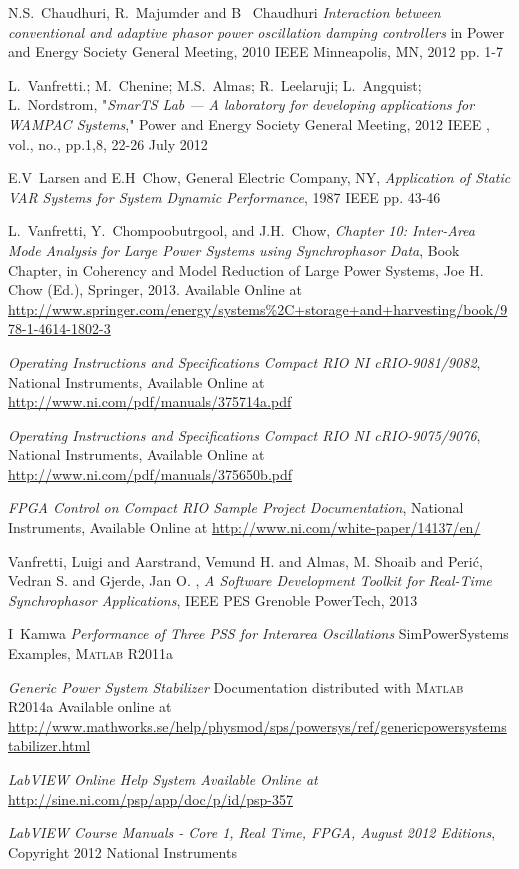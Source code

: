 \documentclass[journal]{IEEEtran}
\begin{document}
\begin{thebibliography}{1}
 N.S.~Chaudhuri, R.~Majumder and B~ Chaudhuri \emph{Interaction between conventional and adaptive phasor power oscillation damping controllers} in Power and Energy Society General Meeting, 2010 IEEE Minneapolis, MN, 2012 pp. 1-7

 L.~Vanfretti.; M.~Chenine; M.S.~Almas; R.~Leelaruji; L.~Angquist; L.~Nordstrom, "\emph{SmarTS Lab — A laboratory for developing applications for WAMPAC Systems}," Power and Energy Society General Meeting, 2012 IEEE , vol., no., pp.1,8, 22-26 July 2012

 E.V~Larsen and E.H~Chow, General Electric Company, NY, \emph{Application of Static VAR Systems for System Dynamic Performance}, 1987 IEEE pp. 43-46

  L.~Vanfretti, Y.~Chompoobutrgool, and J.H.~Chow, \emph{Chapter 10: Inter-Area Mode Analysis for Large Power Systems using Synchrophasor Data}, Book Chapter, in Coherency and Model Reduction of Large Power Systems, Joe H. Chow (Ed.), Springer, 2013. Available Online at \url{http://www.springer.com/energy/systems%2C+storage+and+harvesting/book/978-1-4614-1802-3}

 \emph{Operating Instructions and Specifications Compact RIO NI cRIO-9081/9082}, National Instruments, Available Online at \url{http://www.ni.com/pdf/manuals/375714a.pdf}
  
 \emph{Operating Instructions and Specifications Compact RIO NI cRIO-9075/9076}, National Instruments, Available Online at \url{http://www.ni.com/pdf/manuals/375650b.pdf}

 \emph{FPGA Control on Compact RIO Sample Project Documentation}, National Instruments, Available Online at \url{http://www.ni.com/white-paper/14137/en/}

 Vanfretti, Luigi and Aarstrand, Vemund H. and Almas, M. Shoaib and Peri\'c, Vedran S. and Gjerde, Jan O. , \emph{A Software Development Toolkit for Real-Time Synchrophasor Applications},  IEEE PES Grenoble PowerTech, 2013

 I~Kamwa \emph{Performance of Three PSS for Interarea Oscillations} SimPowerSystems Examples, \textsc{Matlab} R2011a

 \emph{Generic Power System Stabilizer} Documentation distributed with \textsc{Matlab} R2014a Available online at \url{http://www.mathworks.se/help/physmod/sps/powersys/ref/genericpowersystemstabilizer.html}

 \emph{LabVIEW Online Help System Available Online at} \url{http://sine.ni.com/psp/app/doc/p/id/psp-357}

 \emph{LabVIEW Course Manuals - Core 1, Real Time, FPGA, August 2012 Editions}, Copyright 2012 National Instruments

\end{thebibliography}
\end{document}

